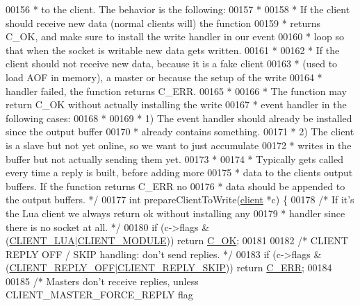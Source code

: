 \begin{DoxyCode}
00156 \textcolor{comment}{ * to the client. The behavior is the following:}
00157 \textcolor{comment}{ *}
00158 \textcolor{comment}{ * If the client should receive new data (normal clients will) the function}
00159 \textcolor{comment}{ * returns C\_OK, and make sure to install the write handler in our event}
00160 \textcolor{comment}{ * loop so that when the socket is writable new data gets written.}
00161 \textcolor{comment}{ *}
00162 \textcolor{comment}{ * If the client should not receive new data, because it is a fake client}
00163 \textcolor{comment}{ * (used to load AOF in memory), a master or because the setup of the write}
00164 \textcolor{comment}{ * handler failed, the function returns C\_ERR.}
00165 \textcolor{comment}{ *}
00166 \textcolor{comment}{ * The function may return C\_OK without actually installing the write}
00167 \textcolor{comment}{ * event handler in the following cases:}
00168 \textcolor{comment}{ *}
00169 \textcolor{comment}{ * 1) The event handler should already be installed since the output buffer}
00170 \textcolor{comment}{ *    already contains something.}
00171 \textcolor{comment}{ * 2) The client is a slave but not yet online, so we want to just accumulate}
00172 \textcolor{comment}{ *    writes in the buffer but not actually sending them yet.}
00173 \textcolor{comment}{ *}
00174 \textcolor{comment}{ * Typically gets called every time a reply is built, before adding more}
00175 \textcolor{comment}{ * data to the clients output buffers. If the function returns C\_ERR no}
00176 \textcolor{comment}{ * data should be appended to the output buffers. */}
00177 \textcolor{keywordtype}{int} prepareClientToWrite(\hyperlink{structclient}{client} *c) \{
00178     \textcolor{comment}{/* If it's the Lua client we always return ok without installing any}
00179 \textcolor{comment}{     * handler since there is no socket at all. */}
00180     \textcolor{keywordflow}{if} (c->flags & (\hyperlink{server_8h_af9d0b0f45ef2c1fd29ac714a300de706}{CLIENT\_LUA}|\hyperlink{server_8h_a633251b1c4bbfe09c54a5c88920d8eda}{CLIENT\_MODULE})) \textcolor{keywordflow}{return} 
      \hyperlink{server_8h_a303769ef1065076e68731584e758d3e1}{C\_OK};
00181 
00182     \textcolor{comment}{/* CLIENT REPLY OFF / SKIP handling: don't send replies. */}
00183     \textcolor{keywordflow}{if} (c->flags & (\hyperlink{server_8h_a9e2a01b79b4567285f1eccbbe0ed35d1}{CLIENT\_REPLY\_OFF}|\hyperlink{server_8h_a792a906c445537043944477fdaad11f4}{CLIENT\_REPLY\_SKIP})) \textcolor{keywordflow}{return} 
      \hyperlink{server_8h_af98ac28d5f4d23d7ed5985188e6fb7d1}{C\_ERR};
00184 
00185     \textcolor{comment}{/* Masters don't receive replies, unless CLIENT\_MASTER\_FORCE\_REPLY flag}

\end{DoxyCode}
